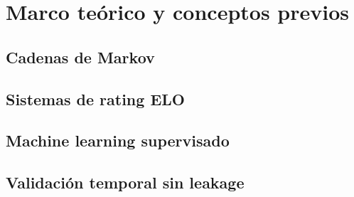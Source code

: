 \chapter{Marco te\'orico y conceptos previos}
\label{ch:marco}

\section{Cadenas de Markov}
\label{sec:markov}

\section{Sistemas de rating ELO}
\label{sec:elo}

\section{Machine learning supervisado}
\label{sec:ml}

\section{Validaci\'on temporal sin leakage}
\label{sec:validacion}
